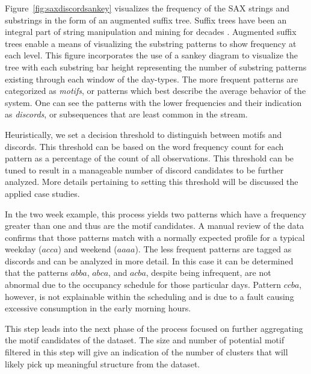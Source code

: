 Figure~\ref{fig:saxdiscordsankey} visualizes the frequency of the SAX strings and substrings in the form of an augmented suffix tree. Suffix trees have been an integral part of string manipulation and mining for decades \citep{weiner_linear_1973}. Augmented suffix trees enable a means of visualizing the substring patterns to show frequency at each level. This figure incorporates the use of a sankey diagram to visualize the tree with each substring bar height representing the number of substring patterns existing through each window of the day-types. The more frequent patterns are categorized as \emph{motifs}, or patterns which best describe the average behavior of the system. One can see the patterns with the lower frequencies and their indication as \emph{discords}, or subsequences that are least common in the stream.  

Heuristically, we set a decision threshold to distinguish between motifs and discords. This threshold can be based on the word frequency count for each pattern as a percentage of the count of all observations. This threshold can be tuned to result in a manageable number of discord candidates to be further analyzed. More details pertaining to setting this threshold will be discussed the applied case studies.


In the two week example, this process yields two patterns which have a frequency greater than one and thus are the motif candidates. A manual review of the data confirms that those patterns match with a normally expected profile for a typical weekday ($acca$) and weekend ($aaaa$). The less frequent patterns are tagged as discords and can be analyzed in more detail. In this case it can be determined that the patterns $abba$, $abca$, and $acba$, despite being infrequent, are not abnormal due to the occupancy schedule for those particular days. Pattern $ccba$, however, is not explainable within the scheduling and is due to a fault causing excessive consumption in the early morning hours.

This step leads into the next phase of the process focused on further aggregating the motif candidates of the dataset. The size and number of potential motif filtered in this step will give an indication of the number of clusters that will likely pick up meaningful structure from the dataset.